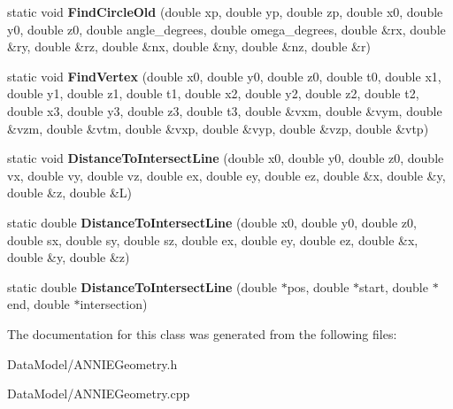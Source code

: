 \begin{DoxyCompactItemize}
\item 
\hypertarget{classANNIEGeometry_a9b64b97c795a3ff52ff8473b844949ab}{
static void {\bfseries FindCircleOld} (double xp, double yp, double zp, double x0, double y0, double z0, double angle\_\-degrees, double omega\_\-degrees, double \&rx, double \&ry, double \&rz, double \&nx, double \&ny, double \&nz, double \&r)}
\label{classANNIEGeometry_a9b64b97c795a3ff52ff8473b844949ab}

\item 
\hypertarget{classANNIEGeometry_a84d4314f64f749a0a7c9a771805226dc}{
static void {\bfseries FindVertex} (double x0, double y0, double z0, double t0, double x1, double y1, double z1, double t1, double x2, double y2, double z2, double t2, double x3, double y3, double z3, double t3, double \&vxm, double \&vym, double \&vzm, double \&vtm, double \&vxp, double \&vyp, double \&vzp, double \&vtp)}
\label{classANNIEGeometry_a84d4314f64f749a0a7c9a771805226dc}

\item 
\hypertarget{classANNIEGeometry_a3ad5ab10afc05105f6be10e87fb69227}{
static void {\bfseries DistanceToIntersectLine} (double x0, double y0, double z0, double vx, double vy, double vz, double ex, double ey, double ez, double \&x, double \&y, double \&z, double \&L)}
\label{classANNIEGeometry_a3ad5ab10afc05105f6be10e87fb69227}

\item 
\hypertarget{classANNIEGeometry_a7564706390f93705700a15d4cf4f43a6}{
static double {\bfseries DistanceToIntersectLine} (double x0, double y0, double z0, double sx, double sy, double sz, double ex, double ey, double ez, double \&x, double \&y, double \&z)}
\label{classANNIEGeometry_a7564706390f93705700a15d4cf4f43a6}

\item 
\hypertarget{classANNIEGeometry_ac39690635de68c00b8c806fcca9ff597}{
static double {\bfseries DistanceToIntersectLine} (double $\ast$pos, double $\ast$start, double $\ast$end, double $\ast$intersection)}
\label{classANNIEGeometry_ac39690635de68c00b8c806fcca9ff597}

\end{DoxyCompactItemize}


The documentation for this class was generated from the following files:\begin{DoxyCompactItemize}
\item 
DataModel/ANNIEGeometry.h\item 
DataModel/ANNIEGeometry.cpp\end{DoxyCompactItemize}
